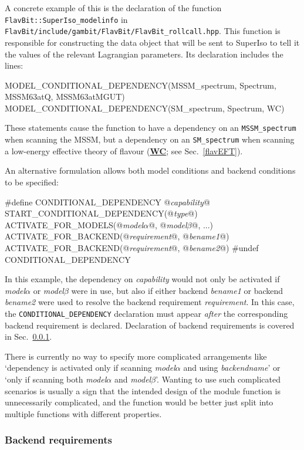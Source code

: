 \documentclass[pdftex,twocolumn,epjc3_preprint,runningheads]{svjour3}
\renewcommand{\_}{\discretionary{\underscore}{}{\underscore}}
\newcommand\cpp[1]{{\lstinline!#1!}}  %
\newcommand\term[1]{{\lstset{style=terminal}\lstinline!#1!\lstset{style=cpp}}}
\newcommand{\doublecrosssf}[2]{\hyperref[#2]{\textbf{\textsf{#1}}}}
\newcommand{\metavarf}[1]{\textit{\color{darkgreen}\footnotesize\textrm{#1}}}
\newcommand{\metavar}{\metavarf}
\newcommand\superiso{\textsf{SuperIso}\xspace}
\begin{document}
A concrete example of this is the declaration of the function \cpp{FlavBit::SuperIso_modelinfo} in \term{FlavBit/include/gambit/FlavBit/FlavBit_rollcall.hpp}.  This function is responsible for constructing the data object that will be sent to \superiso \cite{Mahmoudi:2007vz,Mahmoudi:2008tp} to tell it the values of the relevant Lagrangian parameters.  Its declaration includes the lines:
\begin{lstcpp}
MODEL_CONDITIONAL_DEPENDENCY(MSSM_spectrum,
 Spectrum, MSSM63atQ, MSSM63atMGUT)
MODEL_CONDITIONAL_DEPENDENCY(SM_spectrum,
 Spectrum, WC)
\end{lstcpp}
These statements cause the function to have a dependency on an \cpp{MSSM_spectrum} when scanning the MSSM, but a dependency on an \cpp{SM_spectrum} when scanning a low-energy effective theory of flavour (\doublecrosssf{WC}{WC}; see Sec.\ \ref{flavEFT}).

An alternative formulation allows both model conditions and backend conditions to be specified:
\begin{lstcpp}
#define CONDITIONAL_DEPENDENCY @\metavar{capability}@
START_CONDITIONAL_DEPENDENCY(@\metavar{type}@)
ACTIVATE_FOR_MODELS(@\metavar{model\_$\alpha$}@, @\metavar{model\_$\beta$}@, ...)
ACTIVATE_FOR_BACKEND(@\metavar{requirement}@, @\metavar{be\_name1}@)
ACTIVATE_FOR_BACKEND(@\metavar{requirement}@, @\metavar{be\_name2}@)
#undef CONDITIONAL_DEPENDENCY
\end{lstcpp}
In this example, the dependency on \metavar{capability} would not only be activated if \metavar{model\_$\alpha$} or \metavar{model\_$\beta$} were in use, but also if either backend \metavar{be\_name1} or backend \metavar{be\_name2} were used to resolve the backend requirement \metavar{requirement}.  In this case, the \lstinline{CONDITIONAL_DEPENDENCY} declaration must appear \textit{after} the corresponding backend requirement is declared.  Declaration of backend requirements is covered in Sec.\ \ref{declaration_bereq}.

There is currently no way to specify more complicated arrangements like `dependency is activated only if scanning \metavar{model\_$\alpha$} and using \metavar{backend\_name}' or `only if scanning both \metavar{model\_$\alpha$} and \metavar{model\_$\beta$}'.  Wanting to use such complicated scenarios is usually a sign that the intended design of the module function is unnecessarily complicated, and the function would be better just split into multiple functions with different properties.

\subsubsection{Backend requirements}
\label{declaration_bereq}
\end{document}
